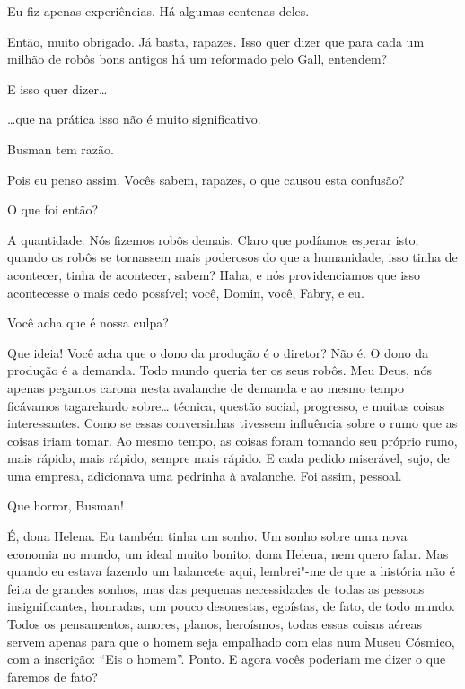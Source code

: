  Eu fiz apenas experiências. Há algumas centenas deles.

 Então, muito obrigado. Já basta, rapazes. Isso quer dizer que para cada um
milhão de robôs bons antigos há um reformado pelo Gall, entendem?

 E isso quer dizer\ldots{}

 \ldots{}que na prática isso não é muito significativo.

 Busman tem razão.

 Pois eu penso assim. Vocês sabem, rapazes, o que causou esta confusão?

 O que foi então?

 A quantidade. Nós fizemos robôs demais. Claro que podíamos esperar isto;
quando os robôs se tornassem mais poderosos do que a humanidade, isso tinha de acontecer, 
tinha de acontecer, sabem? Haha, e nós providenciamos que isso
acontecesse o mais cedo possível; você, Domin, você, Fabry, e eu.

 Você acha que é nossa culpa?

 Que ideia! Você acha que o dono da produção é o diretor? Não é. O dono
da produção é a demanda. Todo mundo queria ter os seus robôs. Meu Deus, nós
apenas pegamos carona nesta avalanche de demanda e ao mesmo tempo ficávamos
tagarelando sobre\ldots{} técnica, questão social, progresso, e muitas coisas
interessantes. Como se essas conversinhas tivessem influência sobre o rumo que
as coisas iriam tomar. Ao mesmo tempo, as coisas foram tomando seu próprio rumo,
mais rápido, mais rápido, sempre mais rápido. E cada pedido miserável, sujo,
de uma empresa, adicionava uma pedrinha à avalanche. Foi assim, pessoal.

 Que horror, Busman!

 É, dona Helena. Eu também tinha um sonho. Um sonho sobre uma nova 
economia no mundo, um ideal muito bonito, dona Helena, nem quero
falar. Mas quando eu estava fazendo um balancete aqui, lembrei"-me de que a história
não é feita de grandes sonhos, mas das pequenas necessidades de todas as pessoas
insignificantes, honradas, um pouco desonestas, egoístas, de fato, de todo
mundo. Todos os pensamentos, amores, planos, heroísmos, todas essas coisas
aéreas servem apenas para que o homem seja empalhado com elas num Museu Cósmico,
com a inscrição: ``Eis o homem''. Ponto. E agora vocês poderiam me dizer o que 
faremos de fato?


